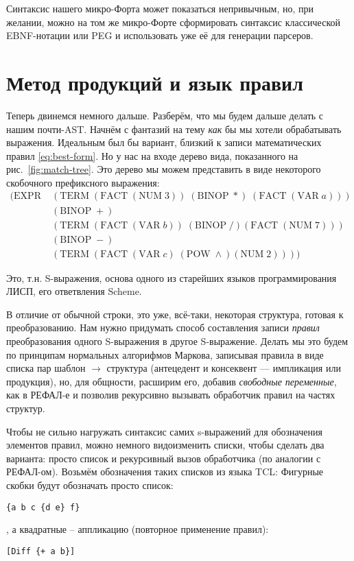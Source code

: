 \documentclass[10pt]{report}
\begin{document}
Синтаксис нашего микро-Форта может показаться непривычным, но,  при желании, можно на том же микро-Форте сформировать синтаксис классической EBNF-нотации или PEG и использовать уже её для генерации парсеров.


\chapter{Метод продукций и язык правил}

Теперь двинемся немного дальше. Разберём, что мы будем дальше делать с нашим почти-AST. Начнём с фантазий на тему \emph{как} бы мы хотели обрабатывать выражения. 
Идеальным был бы вариант, близкий к записи математических правил \eqref{eq:best-form}.
Но у нас на входе дерево вида, показанного на рис.~\ref{fig:match-tree}. 
Это дерево мы можем представить в виде некоторого скобочного префиксного выражения:
\begin{equation}
\begin{split}
	(\mathrm{EXPR}\; & (\mathrm{TERM}\;(\mathrm{FACT}\; (\mathrm{NUM}\; 3))\;(\mathrm{BINOP}\; *)\; (\mathrm{FACT}\; (\mathrm{VAR}\; a))) \\
		  & (\mathrm{BINOP}\; +) \\
		  & (\mathrm{TERM}\; (\mathrm{FACT}\; (\mathrm{VAR}\; b))\;(\mathrm{BINOP}\; /) (\mathrm{FACT}\; (\mathrm{NUM}\;7))) \\
		  & (\mathrm{BINOP}\; -) \\
		  & (\mathrm{TERM}\;(\mathrm{FACT}\;(\mathrm{VAR}\;c)\;(\mathrm{POW}\;\wedge) (\mathrm{NUM}\; 2))))
\end{split} 
\end{equation}

Это, т.н. S-выражения\cite{s-expr}, основа одного из старейших языков программирования ЛИСП, его ответвления Scheme.

В отличие от обычной строки, это уже, всё-таки, некоторая структура, готовая к преобразованию.
Нам нужно придумать способ составления записи {\em правил} преобразования одного S-выражения в другое S-выражение. 
Делать мы это будем по принципам нормальных алгорифмов Маркова\cite{markov}, записывая правила в виде списка пар шаблон $\to$ структура (антецедент и консеквент --- импликация или продукция), но, для общности, расширим его, добавив {\em свободные переменные}, как в РЕФАЛ-е\cite{refal} и позволив рекурсивно вызывать обработчик правил на частях структур.

Чтобы не сильно нагружать синтаксис самих s-выражений для обозначения элементов правил, можно немного видоизменить списки, чтобы сделать два варианта: просто список и рекурсивный вызов обработчика (по аналогии с РЕФАЛ-ом). Возьмём обозначения таких списков из языка TCL\cite{tcl}: Фигурные скобки будут обозначать просто список:
\begin{verbatim}
{a b c {d e} f}
\end{verbatim}
, а квадратные -- аппликацию (повторное применение правил):
\begin{verbatim}
[Diff {+ a b}] 
\end{verbatim}
\end{document}
